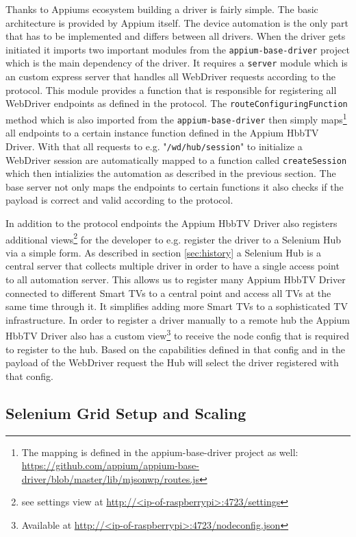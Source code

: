 Thanks to Appiums ecosystem building a driver is fairly simple. The basic architecture is provided by Appium itself.
The device automation is the only part that has to be implemented and differs between all drivers. When the driver
gets initiated it imports two important modules from the \texttt{appium-base-driver} project which is the main
dependency of the driver. It requires a \texttt{server} module which is an custom express server that handles
all WebDriver requests according to the protocol. This module provides a function that is responsible for registering
all WebDriver endpoints as defined in the protocol. The \texttt{routeConfiguringFunction} method which is also
imported from the \texttt{appium-base-driver} then simply maps\footnote{The mapping is defined in the appium-base-driver
project as well: \url{https://github.com/appium/appium-base-driver/blob/master/lib/mjsonwp/routes.js}} all endpoints
to a certain instance function defined in the Appium HbbTV Driver. With that all requests to e.g. "\texttt{/wd/hub/session}"
to initialize a WebDriver session are automatically mapped to a function called \texttt{createSession} which then
intializies the automation as described in the previous section. The base server not only maps the endpoints to
certain functions it also checks if the payload is correct and valid according to the protocol.

In addition to the protocol endpoints the Appium HbbTV Driver also registers additional views\footnote{see settings
view at \url{http://<ip-of-raspberrypi>:4723/settings}} for the developer to e.g. register the driver to a
Selenium Hub via a simple form. As described in section \ref{sec:history} a Selenium Hub is a central server that
collects multiple driver in order to have a single access point to all automation server. This allows us to register
many Appium HbbTV Driver connected to different Smart TVs to a central point and access all TVs at the same time
through it. It simplifies adding more Smart TVs to a sophisticated TV infrastructure. In order to register a driver
manually to a remote hub the Appium HbbTV Driver also has a custom view\footnote{Available at
\url{http://<ip-of-raspberrypi>:4723/nodeconfig.json}} to receive the node config that is required to register to the
hub. Based on the capabilities defined in that config and in the payload of the WebDriver request the Hub will select
the driver registered with that config.

\subsection{Selenium Grid Setup and Scaling\label{sec:setupscaling}}


